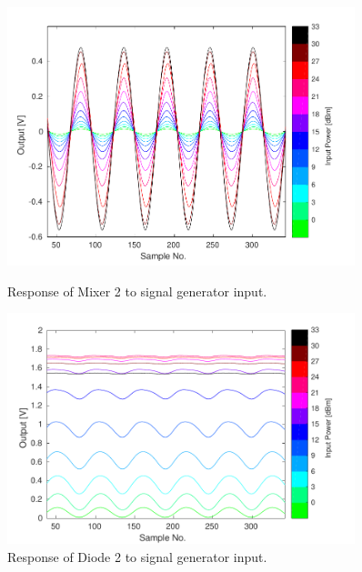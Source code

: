 \begin{figure}
  \centering
  \includegraphics[width=0.9\textwidth]{Figures/phaseMons/Mixer2_AllPowerLevels}
  \caption{Response of Mixer 2 to signal generator input.}
  \label{f:sigGenAllMix2}
  \includegraphics[width=0.9\textwidth]{Figures/phaseMons/Diode2_AllPowerLevels}
  \caption{Response of Diode 2 to signal generator input.}
  \label{f:sigGenAllDio2}
\end{figure}

